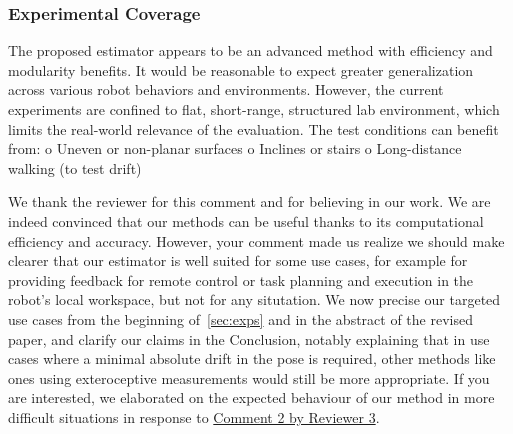 \subsubsection{Experimental Coverage}

\begin{revquote}
The proposed estimator appears to be an advanced method with efficiency and modularity benefits. It would be reasonable to expect greater generalization across various robot behaviors and environments.
However, the current experiments are confined to flat, short-range, structured lab environment, which limits the real-world relevance of the evaluation.
The test conditions can benefit from:
    o Uneven or non-planar surfaces
    o Inclines or stairs
    o Long-distance walking (to test drift)
\end{revquote}

We thank the reviewer for this comment and for believing in our work. We are indeed convinced that our methods can be useful thanks to its computational efficiency and accuracy.
However, your comment made us realize we should make clearer that our estimator is well suited for some use cases, for example for providing feedback for remote control or task planning and execution in the robot's local workspace, but not for any situtation. We now precise our targeted use cases from the beginning of~\ref{sec:exps} and in the abstract of the revised paper, and clarify our claims in the Conclusion, notably explaining that in use cases where a minimal absolute drift in the pose is required, other methods like ones using exteroceptive measurements would still be more appropriate. If you are interested, we elaborated on the expected behaviour of our method in more difficult situations in response to \hyperlink{Comment 2 Rev 3}{Comment 2 by Reviewer 3}.


